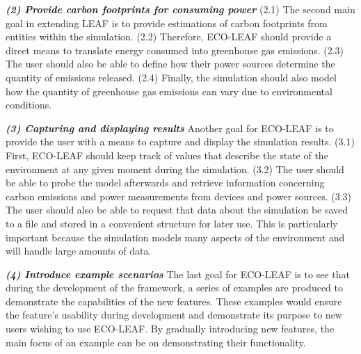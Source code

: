 \documentclass{l4proj}
\begin{document}
\textbf{\textit{(2) Provide carbon footprints for consuming power}}
(2.1) The second main goal in extending LEAF is to provide estimations of carbon footprints from entities within the simulation.
(2.2) Therefore, ECO-LEAF should provide a direct means to translate energy consumed into greenhouse gas emissions.
(2.3) The user should also be able to define how their power sources determine the quantity of emissions released.
(2.4) Finally, the simulation should also model how the quantity of greenhouse gas emissions can vary due to environmental conditions.

\textbf{\textit{(3) Capturing and displaying results}}
Another goal for ECO-LEAF is to provide the user with a means to capture and display the simulation results.
(3.1) First, ECO-LEAF should keep track of values that describe the state of the environment at any given moment during the simulation.
(3.2) The user should be able to probe the model afterwards and retrieve information concerning carbon emissions and power measurements from devices and power sources.
(3.3) The user should also be able to request that data about the simulation be saved to a file and stored in a convenient structure for later use.
This is particularly important because the simulation models many aspects of the environment and will handle large amounts of data.

\textbf{\textit{(4) Introduce example scenarios}}
The last goal for ECO-LEAF is to see that during the development of the framework, a series of examples are produced to demonstrate the capabilities of the new features.
These examples would ensure the feature's usability during development and demonstrate its purpose to new users wishing to use ECO-LEAF.
By gradually introducing new features, the main focus of an example can be on demonstrating their functionality.
\end{document}
